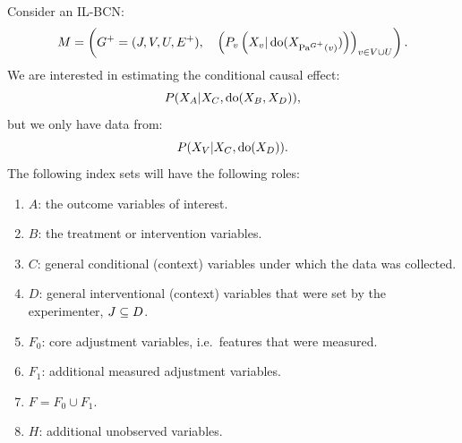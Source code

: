 \begin{Not}
Consider an IL-BCN:
    \[ M = \left ( G^+=(J,V,U,E^+),\quad \left ( P_v\left ( X_v|\operatorname{do}(X_{\mathrm{Pa}^{G^+}(v)})   \right )\right )_{v\in V \cup U} \right ). \]
We are interested in estimating the conditional causal effect:
\[ P(X_A|X_C,\operatorname{do}(X_B,X_D)), \]
but we only have data from:
\[ P(X_V|X_C,\operatorname{do}(X_D)). \]
The following index sets will have the following roles:
\begin{enumerate}
    \item $A$: the outcome variables of interest.
    \item $B$: the treatment or intervention variables.
    \item $C$: general conditional (context) variables under which the data was collected.
    \item $D$: general interventional (context) variables that were set by the experimenter, $J \subseteq D$.
    \item $F_0$: core adjustment variables, i.e.\ features that were measured.
    \item $F_1$: additional measured adjustment variables.
    \item $F = F_0 \cup F_1$.
    \item $H$: additional unobserved variables.
\end{enumerate}


\end{Not}


